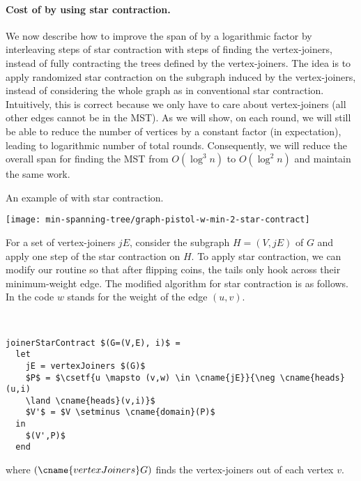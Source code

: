 \paragraph{Cost of \boruvka by using star contraction.}
We now describe how to improve the span of \boruvka by a logarithmic
factor by interleaving steps of star contraction with steps of finding
the vertex-joiners, instead of fully contracting the trees defined by
the vertex-joiners.  The idea is to apply randomized star contraction
on the subgraph induced by the vertex-joiners, instead of considering
the whole graph as in conventional star contraction.  Intuitively,
this is correct because we only have to care about vertex-joiners (all
other edges cannot be in the MST).
%
As we will show, on each round, we will still be able to reduce the
number of vertices by a constant factor (in expectation), leading to
logarithmic number of total rounds. Consequently, we will reduce the
overall span for finding the MST from $O(\log^3 n)$ to $O(\log^2 n)$
and maintain the same work.

\begin{example}
An example of \boruvka with star contraction. 

\begin{center}
\texttt{[image: min-spanning-tree/graph-pistol-w-min-2-star-contract]}
\end{center}
\end{example}

For a set of vertex-joiners $\mathit{jE}$, consider the subgraph $H =
(V, \mathit{jE})$ of $G$ and apply one step of the star contraction on
$H$.  To apply star contraction, we can modify our
 routine so that after flipping coins, the tails
only hook across their minimum-weight edge.    The modified
algorithm for star contraction is as follows.  In the code $w$ stands
for the weight of the edge $(u,v)$.

\begin{algorithm}
~
\begin{lstlisting}
joinerStarContract $(G=(V,E), i)$ =
  let
    jE = vertexJoiners $(G)$
    $P$ = $\csetf{u \mapsto (v,w) \in \cname{jE}}{\neg \cname{heads}(u,i)
    \land \cname{heads}(v,i)}$
    $V'$ = $V \setminus \cname{domain}(P)$
  in 
    $(V',P)$ 
  end
\end{lstlisting}
where $(\cname{vertexJoiners} G)$ finds the vertex-joiners out of each
vertex $v$.
\end{algorithm}

